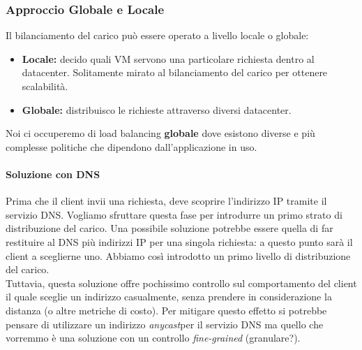 \documentclass{article}
\begin{document}
\subsubsection{Approccio Globale e Locale}
Il bilanciamento del carico può essere operato a livello locale o globale:
\begin{itemize}
    \item \textbf{Locale:} decido quali VM servono una particolare richiesta dentro al datacenter. Solitamente mirato al bilanciamento del carico per ottenere scalabilità.
    \item \textbf{Globale:} distribuisco le richieste attraverso diversi datacenter.
\end{itemize}
Noi ci occuperemo di load balancing \textbf{globale} dove esistono diverse e più complesse politiche che dipendono dall'applicazione in uso.
\paragraph{Soluzione con DNS}
Prima che il client invii una richiesta, deve scoprire l'indirizzo IP tramite il servizio DNS. Vogliamo sfruttare questa fase per introdurre un primo strato di distribuzione del carico. Una possibile soluzione potrebbe essere quella di far restituire al DNS più indirizzi IP per una singola richiesta: a questo punto sarà il client a sceglierne uno. Abbiamo così introdotto un primo livello di distribuzione del carico.\\
Tuttavia, questa soluzione offre pochissimo controllo sul comportamento del client il quale sceglie un indirizzo casualmente, senza prendere in considerazione la distanza (o altre metriche di costo). Per mitigare questo effetto si potrebbe pensare di utilizzare un indirizzo \textit{anycast}\footnotemark per il servizio DNS ma quello che vorremmo è una soluzione con un controllo \textit{fine-grained} (granulare?).
\end{document}
